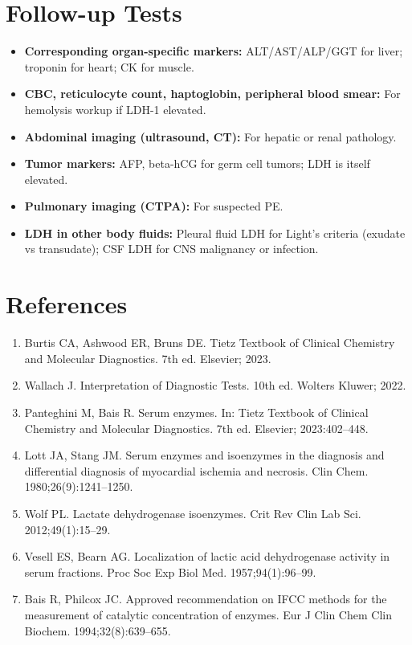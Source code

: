 \section*{Follow-up Tests}
\begin{itemize}
  \item \textbf{Corresponding organ-specific markers:} ALT/AST/ALP/GGT for liver; troponin for heart; CK for muscle.
  \item \textbf{CBC, reticulocyte count, haptoglobin, peripheral blood smear:} For hemolysis workup if LDH-1 elevated.
  \item \textbf{Abdominal imaging (ultrasound, CT):} For hepatic or renal pathology.
  \item \textbf{Tumor markers:} AFP, beta-hCG for germ cell tumors; LDH is itself elevated.
  \item \textbf{Pulmonary imaging (CTPA):} For suspected PE.
  \item \textbf{LDH in other body fluids:} Pleural fluid LDH for Light's criteria (exudate vs transudate); CSF LDH for CNS malignancy or infection.
\end{itemize}

\section*{References}
\begin{enumerate}
  \item Burtis CA, Ashwood ER, Bruns DE. Tietz Textbook of Clinical Chemistry and Molecular Diagnostics. 7th ed. Elsevier; 2023.
  \item Wallach J. Interpretation of Diagnostic Tests. 10th ed. Wolters Kluwer; 2022.
  \item Panteghini M, Bais R. Serum enzymes. In: Tietz Textbook of Clinical Chemistry and Molecular Diagnostics. 7th ed. Elsevier; 2023:402--448.
  \item Lott JA, Stang JM. Serum enzymes and isoenzymes in the diagnosis and differential diagnosis of myocardial ischemia and necrosis. Clin Chem. 1980;26(9):1241--1250.
  \item Wolf PL. Lactate dehydrogenase isoenzymes. Crit Rev Clin Lab Sci. 2012;49(1):15--29.
  \item Vesell ES, Bearn AG. Localization of lactic acid dehydrogenase activity in serum fractions. Proc Soc Exp Biol Med. 1957;94(1):96--99.
  \item Bais R, Philcox JC. Approved recommendation on IFCC methods for the measurement of catalytic concentration of enzymes. Eur J Clin Chem Clin Biochem. 1994;32(8):639--655.
\end{enumerate}

\clearpage
